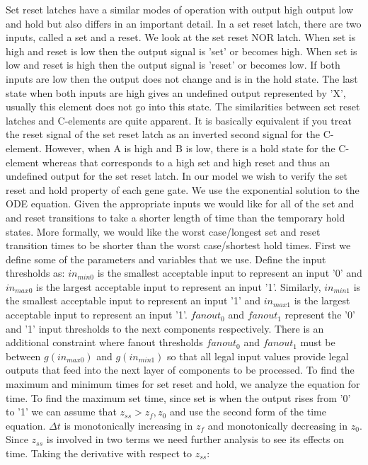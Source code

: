 \documentclass{article}
\begin{document}
Set reset latches have a similar modes of operation with output high output low and hold but also differs in an important detail.  In a set reset latch, there are two inputs, called a set and a reset.  We look at the set reset NOR latch.  When set is high and reset is low then the output signal is 'set' or becomes high.  When set is low and reset is high then the output signal is 'reset' or becomes low.  If both inputs are low then the output does not change and is in the hold state.  The last state when both inputs are high gives an undefined output represented by 'X', usually this element does not go into this state.  The similarities between set reset latches and C-elements are quite apparent.  It is basically equivalent if you treat the reset signal of the set reset latch as an inverted second signal for the C-element.  However, when A is high and B is low, there is a hold state for the C-element whereas that corresponds to a high set and high reset and thus an undefined output for the set reset latch.
\newline  \newline
In our model we wish to verify the set reset and hold property of each gene gate.  We use the exponential solution to the ODE equation.  Given the appropriate inputs we would like for all of the set and and reset transitions to take a shorter length of time than the temporary hold states.  More formally, we would like the worst case/longest set and reset transition times to be shorter than the worst case/shortest hold times.  First we define some of the parameters and variables that we use.  Define the input thresholds as:  $in_{min0}$ is the smallest acceptable input to represent an input '0' and $in_{max0}$ is the largest acceptable input to represent an input '1'.  Similarly, $in_{min1}$ is the smallest acceptable input to represent an input '1' and $in_{max1}$ is the largest acceptable input to represent an input '1'.  $fanout_0$ and $fanout_1$ represent the '0' and '1' input thresholds to the next components respectively.  There is an additional constraint where fanout thresholds $fanout_0$ and $fanout_1$ must be between $g(in_{max0})$ and $g(in_{min1})$ so that all legal input values provide legal outputs that feed into the next layer of components to be processed.
\newline \newline
To find the maximum and minimum times for set reset and hold, we analyze the equation for time.  To find the maximum set time, since set is when the output rises from '0' to '1' we can assume that $z_{ss}>z_f, z_0$ and use the second form of the time equation. $\Delta t$ is monotonically increasing in $z_f$ and monotonically decreasing in $z_0$.  Since $z_{ss}$ is involved in two terms we need further analysis to see its effects on time.  Taking the derivative with respect to $z_{ss}$:
\end{document}
